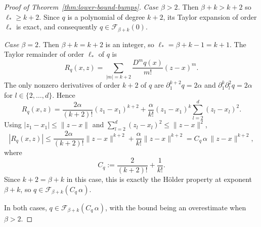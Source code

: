 \documentclass{article}
\renewcommand{\leq}{\leqslant}
\renewcommand{\geq}{\geqslant}
\theoremstyle{definition}
\begin{document}
\begin{proof}[Proof of Theorem~\ref{thm:lower-bound-bumps}]
\emph{Case $\beta>2$.} Then $\beta+k>k+2$ so $\ell_*\geq k+2$. 
Since $q$ is a polynomial of degree $k+2$, its Taylor expansion of 
order $\ell_*$ is exact, and consequently 
$q\in\mathcal{F}_{\beta+k}(0)$.

\emph{Case $\beta=2$.} Then $\beta+k=k+2$ is an integer, so 
$\ell_*=\beta+k-1=k+1$. The Taylor remainder of order $\ell_*$ of 
$q$ is 
\[
R_q(x,z)=\sum_{|m|=k+2}\frac{D^m q(x)}{m!}(z-x)^m.
\]
The only nonzero derivatives of order $k+2$ of $q$ are 
$\partial_1^{k+2}q=2\alpha$ and 
$\partial_1^k\partial_l^2 q=2\alpha$ for $l\in\{2,\dots,d\}$. 
Hence
\[
R_q(x,z)
=\frac{2\alpha}{(k+2)!}(z_1-x_1)^{k+2}
+\frac{\alpha}{k!}(z_1-x_1)^k\sum_{l=2}^d(z_l-x_l)^2.
\]
Using $|z_1-x_1|\leq\|z-x\|$ and 
$\sum_{l=2}^d(z_l-x_l)^2\leq\|z-x\|^2$,
\[
|R_q(x,z)|
\leq\frac{2\alpha}{(k+2)!}\|z-x\|^{k+2}
+\frac{\alpha}{k!}\|z-x\|^{k+2}
=C_q\,\alpha\,\|z-x\|^{k+2},
\]
where 
\begin{equation}
\label{eq:lb-Cq-def}
C_q:=\frac{2}{(k+2)!}+\frac{1}{k!}.
\end{equation}
Since $k+2=\beta+k$ in this case, this is exactly the H\"older 
property at exponent $\beta+k$, so 
$q\in\mathcal{F}_{\beta+k}(C_q\,\alpha)$.

In both cases, $q\in\mathcal{F}_{\beta+k}(C_q\,\alpha)$, with the 
bound being an overestimate when $\beta>2$.


\end{proof}
\end{document}
